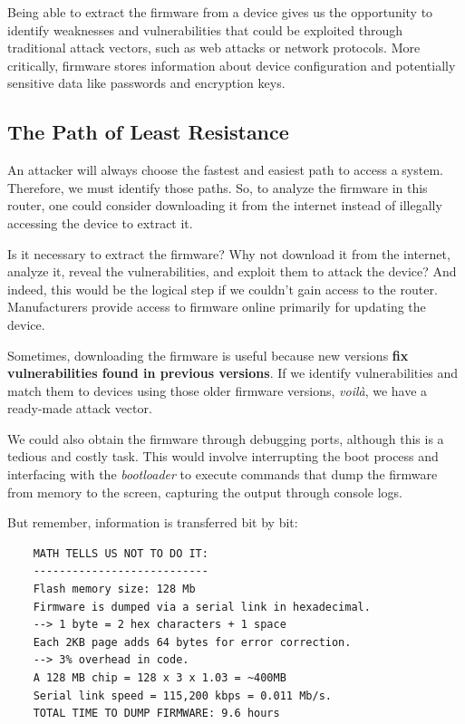 \documentclass[12pt,a4paper, brazil]{article}
\begin{document}
Being able to extract the firmware from a device gives us the opportunity to identify weaknesses and vulnerabilities that could be exploited through traditional attack vectors, such as web attacks or network protocols. More critically, firmware stores information about device configuration and potentially sensitive data like passwords and encryption keys.

\subsection{The Path of Least Resistance}

An attacker will always choose the fastest and easiest path to access a system. Therefore, we must identify those paths. So, to analyze the firmware in this router, one could consider downloading it from the internet instead of illegally accessing the device to extract it.

Is it necessary to extract the firmware? Why not download it from the internet, analyze it, reveal the vulnerabilities, and exploit them to attack the device? And indeed, this would be the logical step if we couldn’t gain access to the router. Manufacturers provide access to firmware online primarily for updating the device.

Sometimes, downloading the firmware is useful because new versions \textbf{fix vulnerabilities found in previous versions}. If we identify vulnerabilities and match them to devices using those older firmware versions, \emph{voilà}, we have a ready-made attack vector.

We could also obtain the firmware through debugging ports, although this is a tedious and costly task. This would involve interrupting the boot process and interfacing with the \emph{bootloader} to execute commands that dump the firmware from memory to the screen, capturing the output through console logs.

But remember, information is transferred bit by bit:

\begin{verbatim}
    MATH TELLS US NOT TO DO IT:
    ---------------------------
    Flash memory size: 128 Mb
    Firmware is dumped via a serial link in hexadecimal.
    --> 1 byte = 2 hex characters + 1 space
    Each 2KB page adds 64 bytes for error correction.
    --> 3% overhead in code.
    A 128 MB chip = 128 x 3 x 1.03 = ~400MB
    Serial link speed = 115,200 kbps = 0.011 Mb/s.
    TOTAL TIME TO DUMP FIRMWARE: 9.6 hours
\end{verbatim}
\end{document}
